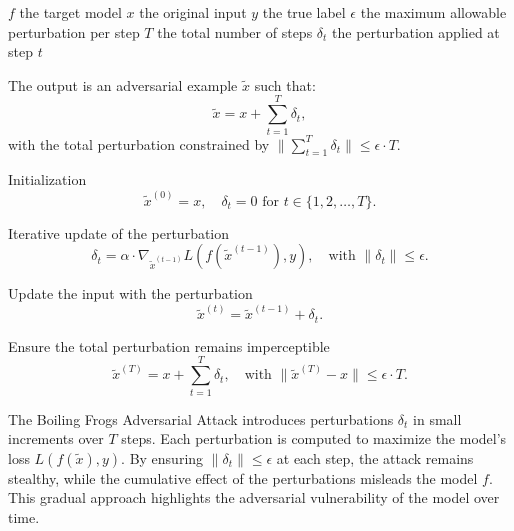 $f$ the target model
$x$ the original input
$y$ the true label
$\epsilon$ the maximum allowable perturbation per step
$T$ the total number of steps
$\delta_t$ the perturbation applied at step $t$

The output is an adversarial example $\tilde{x}$ such that:
\[
\tilde{x} = x + \sum_{t=1}^T \delta_t,
\]
with the total perturbation constrained by \( \|\sum_{t=1}^T \delta_t\| \leq \epsilon \cdot T \).

Initialization
   \[
   \tilde{x}^{(0)} = x, \quad \delta_t = 0 \text{ for } t \in \{1, 2, \ldots, T\}.
   \]

Iterative update of the perturbation
   \[
   \delta_t = \alpha \cdot \nabla_{\tilde{x}^{(t-1)}} L(f(\tilde{x}^{(t-1)}), y), \quad \text{with } \|\delta_t\| \leq \epsilon.
   \]

Update the input with the perturbation
   \[
   \tilde{x}^{(t)} = \tilde{x}^{(t-1)} + \delta_t.
   \]

Ensure the total perturbation remains imperceptible
   \[
   \tilde{x}^{(T)} = x + \sum_{t=1}^T \delta_t, \quad \text{with } \|\tilde{x}^{(T)} - x\| \leq \epsilon \cdot T.
   \]

The Boiling Frogs Adversarial Attack introduces perturbations \( \delta_t \) in small increments over \( T \) steps. Each perturbation is computed to maximize the model's loss \( L(f(\tilde{x}), y) \). By ensuring \( \|\delta_t\| \leq \epsilon \) at each step, the attack remains stealthy, while the cumulative effect of the perturbations misleads the model \( f \). This gradual approach highlights the adversarial vulnerability of the model over time.
